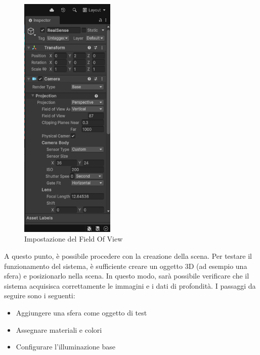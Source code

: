\documentclass[11pt]{report}
\begin{document}
\begin{figure}[H]
    \centering
    \includegraphics[width=0.4\textwidth]{images/Immagine2.png}
    \caption{Impostazione del Field Of View}
    \label{fig:fov_setting}
\end{figure}

A questo punto, è possibile procedere con la creazione della scena. Per testare il funzionamento del sistema, è sufficiente creare un oggetto 3D (ad esempio una sfera) e posizionarlo nella scena. In questo modo, sarà possibile verificare che il sistema acquisisca correttamente le immagini e i dati di profondità. I passaggi da seguire sono i seguenti:
\begin{itemize}
\item Aggiungere una sfera come oggetto di test
\item Assegnare materiali e colori
\item Configurare l'illuminazione base
\end{itemize}

\end{document}

